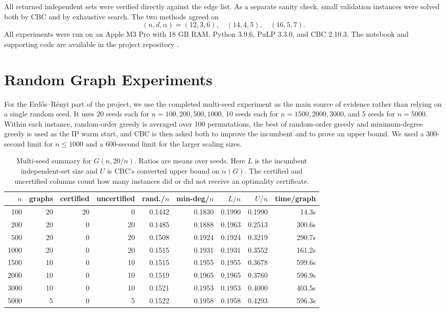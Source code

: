 \documentclass[11pt]{article}
\begin{document}
All returned independent sets were verified directly against the edge list.
As a separate sanity check, small validation instances were solved both by CBC
and by exhaustive search.  The two methods agreed on
\[
(n,d,\alpha)=(12,3,6),\quad (14,4,5),\quad (16,5,7).
\]
All experiments were run on an Apple M3 Pro with 18 GB RAM, Python 3.9.6,
PuLP 3.3.0, and CBC 2.10.3.  The notebook and supporting code are available in
the project repository \cite{code}.

\section{Random Graph Experiments}

For the Erdős--Rényi part of the project, we use the completed multi-seed
experiment as the main source of evidence rather than relying on a single
random seed.  It uses 20 seeds each for $n=100,200,500,1000$, 10 seeds each
for $n=1500,2000,3000$, and 5 seeds for $n=5000$.  Within each instance,
random-order greedy is averaged over 100 permutations, the best of
random-order greedy and minimum-degree greedy is used as the IP warm start,
and CBC is then asked both to improve the incumbent and to prove an upper
bound.  We used a 300-second limit for $n\le 1000$ and a 600-second limit for
the larger scaling sizes.

\begin{table}[H]
\centering
\caption{Multi-seed summary for $G(n,20/n)$.  Ratios are means over seeds.
Here $L$ is the incumbent independent-set size and $U$ is CBC's converted upper
bound on $\alpha(G)$.  The certified and uncertified columns count how many
instances did or did not receive an optimality certificate.}
\label{tab:er-long}
\scriptsize
\setlength{\tabcolsep}{4pt}
\begin{tabular}{rrrrrrrrr}
\toprule
$n$ & graphs & certified & uncertified & rand./$n$ & min-deg/$n$ & $L/n$ & $U/n$ & time/graph \\
\midrule
100  & 20 & 20 & 0  & 0.1442 & 0.1830 & 0.1990 & 0.1990 & 14.3s \\
200  & 20 & 0  & 20 & 0.1485 & 0.1888 & 0.1963 & 0.2513 & 300.6s \\
500  & 20 & 0  & 20 & 0.1508 & 0.1924 & 0.1924 & 0.3219 & 290.7s \\
1000 & 20 & 0  & 20 & 0.1515 & 0.1931 & 0.1931 & 0.3552 & 161.2s \\
1500 & 10 & 0  & 10 & 0.1515 & 0.1955 & 0.1955 & 0.3678 & 599.6s \\
2000 & 10 & 0  & 10 & 0.1519 & 0.1965 & 0.1965 & 0.3760 & 596.9s \\
3000 & 10 & 0  & 10 & 0.1521 & 0.1953 & 0.1953 & 0.4000 & 403.5s \\
5000 & 5  & 0  & 5  & 0.1522 & 0.1958 & 0.1958 & 0.4293 & 596.3s \\
\bottomrule
\end{tabular}
\end{table}
\end{document}
